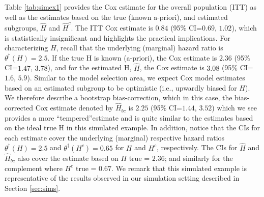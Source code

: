 \documentclass[smallextended]{svjour3}
\def\hplim{\theta^{\dagger}(H)}
\def\hcplim{\theta^{\dagger}(H^{c})}
\begin{document}
Table \ref{tab:simex1} provides the Cox estimate for the overall population (ITT) as well as the estimates based on the true (known a-priori), and estimated subgroups, $\hat{H}$ and $\hat{H}^{c}$.  The ITT Cox estimate is $0.84$ (95\% CI=$0.69$, $1.02$), 
which is statistically insignificant and highlights the practical implications.  For characterizing $H$, recall that the underlying (marginal) hazard ratio is $\hplim =2.5$.  If the true H is known (a-priori), the Cox estimate is $2.36$ (95\% CI=$1.47$, $3.78$), and for the estimated H, $\hat{H}$, the Cox estimate is $3.08$ (95\% CI=$1.6$, 
$5.9$).  Similar to the model selection area, we expect Cox model estimates based on an estimated subgroup to be optimistic (i.e., upwardly biased for $H$).  We therefore describe a bootstrap bias-correction, which in this case, the bias-corrected Cox estimate denoted by $\hat{H}_{bc}$ is $2.25$ (95\% CI=$1.44$, $3.52$) which we see provides a more ``tempered''estimate and is quite similar to the estimates based on the ideal true H in this simulated example.  
In addition, notice that the CIs for each estimate cover the underlying (marginal) respective hazard ratios 
$\hplim =2.5$ and $\hcplim =0.65$ for $H$ and $H^{c}$, respectively.  
The CIs for $\hat{H}$ and $\hat{H}_{bc}$ also cover the estimate based on $H$ true =  $2.36$; and similarly for the complement where $H^{c}$ true =  $0.67$.  We remark that this simulated example is representative of the results observed in our simulation setting described in Section \ref{sec:sims}.










\end{document}
